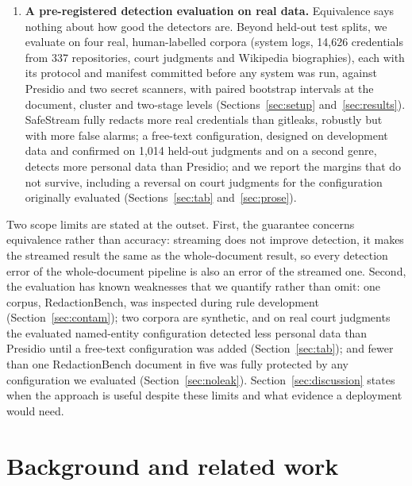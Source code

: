 \documentclass[pdflatex,sn-mathphys-num]{sn-jnl}
\theoremstyle{thmstyleone}
\theoremstyle{thmstylethree}
\begin{document}
\begin{enumerate}
\item \textbf{A pre-registered detection evaluation on real data.} Equivalence says nothing about how good the detectors are. Beyond held-out test splits, we evaluate on four real, human-labelled corpora (system logs, 14,626 credentials from 337 repositories, court judgments and Wikipedia biographies), each with its protocol and manifest committed before any system was run, against Presidio and two secret scanners, with paired bootstrap intervals at the document, cluster and two-stage levels (Sections~\ref{sec:setup} and~\ref{sec:results}). SafeStream fully redacts more real credentials than gitleaks, robustly but with more false alarms; a free-text configuration, designed on development data and confirmed on 1,014 held-out judgments and on a second genre, detects more personal data than Presidio; and we report the margins that do not survive, including a reversal on court judgments for the configuration originally evaluated (Sections~\ref{sec:tab} and~\ref{sec:prose}).
\end{enumerate}

Two scope limits are stated at the outset. First, the guarantee concerns equivalence rather than accuracy: streaming does not improve detection, it makes the streamed result the same as the whole-document result, so every detection error of the whole-document pipeline is also an error of the streamed one. Second, the evaluation has known weaknesses that we quantify rather than omit: one corpus, RedactionBench, was inspected during rule development (Section~\ref{sec:contam}); two corpora are synthetic, and on real court judgments the evaluated named-entity configuration detected less personal data than Presidio until a free-text configuration was added (Section~\ref{sec:tab}); and fewer than one RedactionBench document in five was fully protected by any configuration we evaluated (Section~\ref{sec:noleak}). Section~\ref{sec:discussion} states when the approach is useful despite these limits and what evidence a deployment would need.

\section{Background and related work}\label{sec:related}
\end{document}
